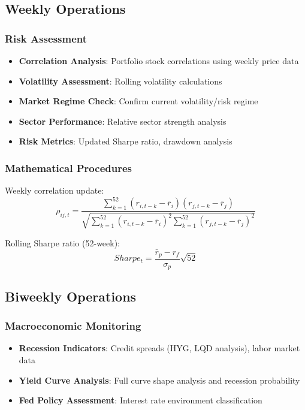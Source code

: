 \documentclass[12pt,a4paper]{article}
\begin{document}
\subsection{Weekly Operations}

\subsubsection{Risk Assessment}
\begin{itemize}
    \item \textbf{Correlation Analysis}: Portfolio stock correlations using weekly price data
    \item \textbf{Volatility Assessment}: Rolling volatility calculations  
    \item \textbf{Market Regime Check}: Confirm current volatility/risk regime
    \item \textbf{Sector Performance}: Relative sector strength analysis
    \item \textbf{Risk Metrics}: Updated Sharpe ratio, drawdown analysis
\end{itemize}

\subsubsection{Mathematical Procedures}
Weekly correlation update:
\begin{equation}
\rho_{ij,t} = \frac{\sum_{k=1}^{52} (r_{i,t-k} - \bar{r}_{i})(r_{j,t-k} - \bar{r}_{j})}{\sqrt{\sum_{k=1}^{52} (r_{i,t-k} - \bar{r}_{i})^2 \sum_{k=1}^{52} (r_{j,t-k} - \bar{r}_{j})^2}}
\end{equation}

Rolling Sharpe ratio (52-week):
\begin{equation}
Sharpe_t = \frac{\bar{r}_p - r_f}{\sigma_p} \sqrt{52}
\end{equation}

\subsection{Biweekly Operations}

\subsubsection{Macroeconomic Monitoring}
\begin{itemize}
    \item \textbf{Recession Indicators}: Credit spreads (HYG, LQD analysis), labor market data
    \item \textbf{Yield Curve Analysis}: Full curve shape analysis and recession probability
    \item \textbf{Fed Policy Assessment}: Interest rate environment classification
\end{itemize}
\end{document}
